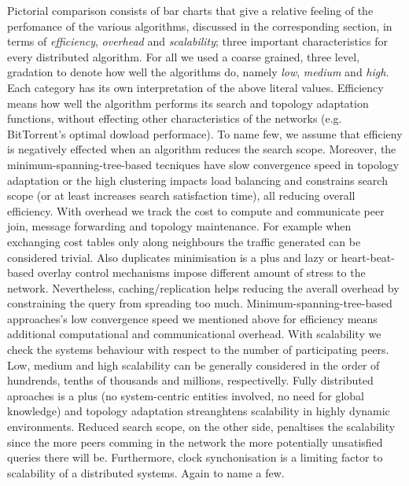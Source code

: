 Pictorial comparison consists of bar charts that give a relative feeling of the
perfomance of the various algorithms, discussed in the corresponding section, in
terms of \emph{efficiency}, \emph{overhead} and \emph{scalability}; three
important characteristics for every distributed algorithm. For all we used a
coarse grained, three level, gradation to denote how well the algorithms do,
namely \emph{low}, \emph{medium} and \emph{high}. Each category has its own
interpretation of the above literal values. Efficiency means how well the
algorithm performs its search and topology adaptation functions, without
effecting other characteristics of the networks (e.g. BitTorrent's optimal
dowload performace). To name few, we assume that efficieny is
negatively effected when an algorithm reduces the search scope. Moreover, the
minimum-spanning-tree-based tecniques have slow convergence speed in topology
adaptation or the high clustering impacts load balancing and constrains search
scope (or at least increases search satisfaction time), all reducing overall
efficiency. With overhead we track the cost to compute and communicate peer
join, message forwarding and topology maintenance. For example when exchanging
cost tables only along neighbours the traffic generated can be considered
trivial. Also duplicates minimisation is a plus and lazy or heart-beat-based
overlay control mechanisms impose different amount of stress to the network.
Nevertheless, caching/replication helps reducing the averall overhead by
constraining the query from spreading too much. Minimum-spanning-tree-based
approaches's low convergence speed we mentioned above for efficiency means
additional computational and communicational overhead. %
With scalability we check the systems behaviour with respect to the number of
participating peers. Low, medium and high scalability can be generally
considered in the order of hundrends, tenths of thousands and millions,
respectivelly. Fully distributed aproaches is a plus (no system-centric entities
involved, no need for global knowledge) and topology adaptation streanghtens
scalability in highly dynamic environments. Reduced search scope, on the other
side, penaltises the scalability since the more peers comming in the network the
more potentially unsatisfied queries there will be. Furthermore, clock
synchonisation is a limiting factor to scalability of a distributed systems.
Again to name a few.

%
%
%

